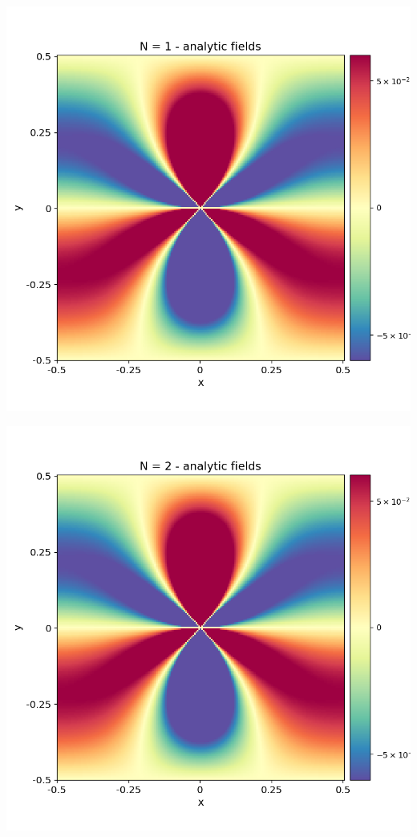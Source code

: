 \documentclass[12pt,a4paper]{article}
\theoremstyle{plain}
\begin{document}
\begin{minipage}{0.24\textwidth}
	\centering
	\includegraphics[width=\textwidth]{../stress_field_01.png}
\end{minipage}
\begin{minipage}{0.24\textwidth}
	\centering
	\includegraphics[width=\textwidth]{../stress_field_02.png}
\end{minipage}	
\end{document}
